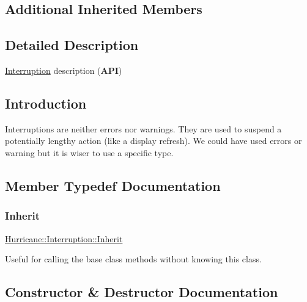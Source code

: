 \subsection*{Additional Inherited Members}


\subsection{Detailed Description}
\mbox{\hyperlink{classHurricane_1_1Interruption}{Interruption}} description ({\bfseries A\+PI}) 

\hypertarget{classHurricane_1_1Interruption_secInterruptionIntro}{}\subsection{Introduction}\label{classHurricane_1_1Interruption_secInterruptionIntro}
Interruptions are neither errors nor warnings. They are used to suspend a potentially lengthy action (like a display refresh). We could have used errors or warning but it is wiser to use a specific type. 

\subsection{Member Typedef Documentation}
\mbox{\label{classHurricane_1_1Interruption_a47ecad9b4b2bd34a21de4a0d6fdf1f5d}} 
\subsubsection{\texorpdfstring{Inherit}{Inherit}}
{\footnotesize\ttfamily \mbox{\hyperlink{classHurricane_1_1Interruption_a47ecad9b4b2bd34a21de4a0d6fdf1f5d}{Hurricane\+::\+Interruption\+::\+Inherit}}}

Useful for calling the base class methods without knowing this class. 

\subsection{Constructor \& Destructor Documentation}
\mbox{\label{classHurricane_1_1Interruption_ae6375068418b2898b95c3cb7974e051c}} 

